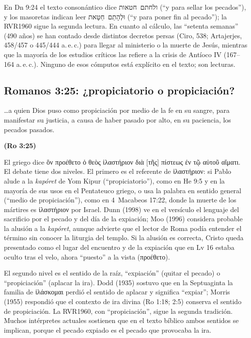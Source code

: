 \documentclass[11pt,letterpaper]{article}
\newcommand{\heb}[1]{\mbox{\foreignlanguage{hebrew}{#1}}}
\newcommand{\grc}[1]{\foreignlanguage{ancientgreek}{#1}}
\newcommand{\fuente}[1]{\par\hfill{\upshape\bfseries\small\textcolor{tierraroja}{#1}}}
\begin{document}
\begin{nota}
En Dn 9:24 el texto consonántico dice \heb{ולחתם חטאות} (``y para sellar los pecados''), y los masoretas indican leer \heb{וּלְהָתֵם חַטָּאת} (``y para poner fin al pecado''); la RVR1960 sigue la segunda lectura. En cuanto al cálculo, las ``setenta semanas'' (490 años) se han contado desde distintos decretos persas (Ciro, 538; Artajerjes, 458/457 o 445/444 a.\,e.\,c.) para llegar al ministerio o la muerte de Jesús, mientras que la mayoría de los estudios críticos las refiere a la crisis de Antíoco IV (167--164 a.\,e.\,c.). Ninguno de esos cómputos está explícito en el texto; son lecturas.
\end{nota}

\subsection{Romanos 3:25: ¿propiciatorio o propiciación?}
\begin{cita}\ldots{}a quien Dios puso como propiciación por medio de la fe en su sangre, para manifestar su justicia, a causa de haber pasado por alto, en su paciencia, los pecados pasados.\fuente{(Ro 3:25)}\end{cita}

El griego dice \grc{ὃν προέθετο ὁ θεὸς ἱλαστήριον διὰ [τῆς] πίστεως ἐν τῷ αὐτοῦ αἵματι}. El debate tiene dos niveles. El primero es el referente de \grc{ἱλαστήριον}: si Pablo alude a la \emph{kapóret} de Yom Kipur (``propiciatorio''), como en He 9:5 y en la mayoría de sus usos en el Pentateuco griego, o usa la palabra en sentido general (``medio de propiciación''), como en 4~Macabeos 17:22, donde la muerte de los mártires es \grc{ἱλαστήριον} por Israel. Dunn (1998) ve en el versículo el lenguaje del sacrificio por el pecado y del día de la expiación; Moo (1996) considera probable la alusión a la \emph{kapóret}, aunque advierte que el lector de Roma podía entender el término sin conocer la liturgia del templo. Si la alusión es correcta, Cristo queda presentado como el lugar del encuentro y de la expiación que en Lv 16 estaba oculto tras el velo, ahora ``puesto'' a la vista (\grc{προέθετο}).

El segundo nivel es el sentido de la raíz, ``expiación'' (quitar el pecado) o ``propiciación'' (aplacar la ira). Dodd (1935) sostuvo que en la Septuaginta la familia de \grc{ἱλάσκομαι} perdió el sentido de aplacar y significa ``expiar''; Morris (1955) respondió que el contexto de ira divina (Ro 1:18; 2:5) conserva el sentido de propiciación. La RVR1960, con ``propiciación'', sigue la segunda tradición. Muchos intérpretes actuales sostienen que en el texto bíblico ambos sentidos se implican, porque el pecado expiado es el pecado que provocaba la ira.
\end{document}
